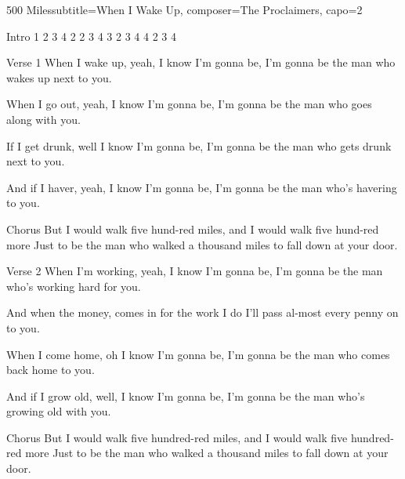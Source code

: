 \begin{song}{500 Miles}{subtitle={When I Wake Up}, composer={The Proclaimers}, capo={2}}

Intro
 1 2 3 4     2 2 3 4     3 2 3 4     4 2 3 4

Verse 1
When I wake up, yeah, I know I'm gonna be,
I'm gonna be the man who wakes up next to you.

When I go out, yeah, I know I'm gonna be,
I'm gonna be the man who goes along with you.

If I get drunk, well I know I'm gonna be,
I'm gonna be the man who gets drunk next to you.

And if I haver, yeah, I know I'm gonna be,
I'm gonna be the man who's havering to you.

Chorus
But I would walk  five hund-red miles, and
I    would     walk    five hund-red    more
Just to be the man who walked a thousand miles
to fall down at your door.    


Verse 2
When I'm working, yeah, I know I'm gonna be,
I'm gonna be the man who's working hard for you.

And when the money,    comes in for the work I do
I'll pass al-most every penny on to you.

When I come home, oh I know I'm gonna be,
I'm gonna be the man who comes back home to you.

And if I grow old, well, I know I'm gonna be,
I'm gonna be the man who's growing old with you.


Chorus
But I would walk five hundred-red miles, and
I would walk five hundred-red more
Just to be the man who walked a thousand miles
to fall down at your door.    




\end{song}
